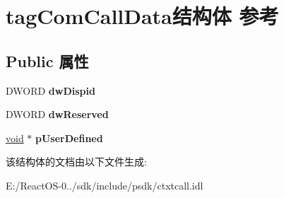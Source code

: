 \hypertarget{structtag_com_call_data}{}\section{tag\+Com\+Call\+Data结构体 参考}
\label{structtag_com_call_data}
\subsection*{Public 属性}
\begin{DoxyCompactItemize}
\item 
\mbox{\label{structtag_com_call_data_a6722ce31e6d0a8aedcf67df77c957c5e}} 
D\+W\+O\+RD {\bfseries dw\+Dispid}
\item 
\mbox{\label{structtag_com_call_data_ad68f2d5f9b8082ea7f015dba26103b72}} 
D\+W\+O\+RD {\bfseries dw\+Reserved}
\item 
\mbox{\label{structtag_com_call_data_a894e815d0c418e31b3d68a4349f2d86a}} 
\hyperlink{interfacevoid}{void} $\ast$ {\bfseries p\+User\+Defined}
\end{DoxyCompactItemize}


该结构体的文档由以下文件生成\+:\begin{DoxyCompactItemize}
\item 
E\+:/\+React\+O\+S-\/0../sdk/include/psdk/ctxtcall.\+idl\end{DoxyCompactItemize}
